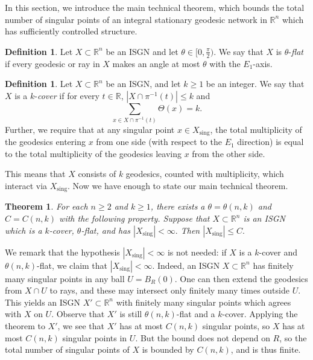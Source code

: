 \documentclass[11pt,reqno,twoside]{amsart}
\newcommand{\sing}{\mathrm{sing}}
\newtheorem{theorem}[lemma]{Theorem}
\theoremstyle{definition}
\newtheorem{definition}[lemma]{Definition}
\begin{document}
In this section, we introduce the main technical theorem, which bounds the total number of singular points of an integral stationary geodesic network in $\mathbb{R}^n$ which has sufficiently controlled structure.

\begin{definition}
    Let $X \subset \mathbb{R}^n$ be an ISGN and let $\theta \in [0,\frac{\pi}{2})$. We say that $X$ is $\theta$-\emph{flat} if every geodesic or ray in $X$ makes an angle at most $\theta$ with the $E_1$-axis.
\end{definition}

\begin{definition}
    Let $X \subset \mathbb{R}^n$ be an ISGN, and let $k \geq 1$ be an integer. We say that $X$ is a $k$-\emph{cover} if for every $t \in \mathbb{R}$, $|X \cap \pi^{-1}(t)| \leq k$ and 
    \[\sum_{x \in X \cap \pi^{-1}(t)} \Theta(x) = k.\] Further, we require that at any singular point $x \in X_\sing$, the total multiplicity of the geodesics entering $x$ from one side (with respect to the $E_1$ direction) is equal to the total multiplicity of the geodesics leaving $x$ from the other side.
\end{definition}

This means that $X$ consists of $k$ geodesics, counted with multiplicity, which interact via $X_\sing$. Now we have enough to state our main technical theorem.

\begin{theorem} \label{maintechnicaltheorem}
    For each $n \geq 2$ and $k \geq 1$, there exists a $\theta = \theta(n,k)$ and $C = C(n,k)$ with the following property. Suppose that $X \subset \mathbb{R}^n$ is an ISGN which is a $k$-cover, $\theta$-flat, and has $|X_\sing|< \infty.$ Then $|X_\sing| \leq C.$
\end{theorem}

We remark that the hypothesis $|X_\sing| < \infty$ is not needed: if $X$ is a $k$-cover and $\theta(n,k)$-flat, we claim that $|X_\sing| < \infty$. Indeed, an ISGN $X \subset \mathbb{R}^n$ has finitely many singular points in any ball $U = B_R(0)$. One can then extend the geodesics from $X \cap U$ to rays, and these may intersect only finitely many times outside $U$. This yields an ISGN $X' \subset \mathbb{R}^n$ with finitely many singular points which agrees with $X$ on $U$. Observe that $X'$ is still $\theta(n,k)$-flat and a $k$-cover. Applying the theorem to $X'$, we see that $X'$ has at most $C(n,k)$ singular points, so $X$ has at most $C(n,k)$ singular points in $U$.
But the bound does not depend on $R$, so the total number of singular points of $X$ is bounded by $C(n,k)$, and is thus finite.
\end{document}
